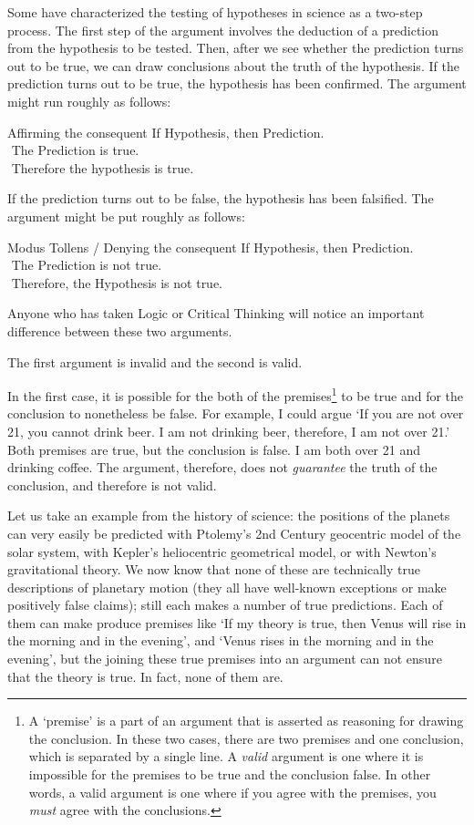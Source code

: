 \begin{refsection}
Some have characterized the testing of hypotheses in science as a two-step process. The first step of the argument involves the deduction of a prediction from the hypothesis to be tested. Then, after we see whether the prediction turns out to be true, we can draw conclusions about the truth of the hypothesis. If the prediction turns out to be true, the hypothesis has been confirmed. The argument might run roughly as follows:
\begin{apatextbox}{Affirming the consequent}
If Hypothesis, then Prediction.\\ The Prediction is true. \\ \hline Therefore the hypothesis is true.
\end{apatextbox}
If the prediction turns out to be false, the hypothesis has been falsified. The argument might be put roughly as follows:
\begin{apatextbox}{Modus Tollens / Denying the consequent}
If Hypothesis, then Prediction.\\ The Prediction is not true.\\ \hline Therefore, the Hypothesis is not true.
\end{apatextbox}
Anyone who has taken Logic or Critical Thinking will notice an important difference between these two arguments. 

The first argument is invalid and the second is valid. 

In the first case, it is possible for the both of the premises\footnote{A `premise' is a part of an argument that is asserted as reasoning for drawing the conclusion. In these two cases, there are two premises and one conclusion, which is separated by a single line. A \emph{valid} argument is one where it is impossible for the premises to be true and the conclusion false. In other words, a valid argument is one where if you agree with the premises, you \emph{must} agree with the conclusions.} to be true and for the conclusion to nonetheless be false. For example, I could argue `If you are not over 21, you cannot drink beer. I am not drinking beer, therefore, I am not over 21.' Both premises are true, but the conclusion is false. I am both over 21 and drinking coffee. The argument, therefore, does not \emph{guarantee} the truth of the conclusion, and therefore is not valid.

Let us take an example from the history of science: the positions of the planets can very easily be predicted with Ptolemy's 2nd Century geocentric model of the solar system, with Kepler's heliocentric geometrical model, or with Newton's gravitational theory. We now know that none of these are technically true descriptions of planetary motion (they all have well-known exceptions or make positively false claims); still each makes a number of true predictions. Each of them can make produce premises like `If my theory is true, then Venus will rise in the morning and in the evening', and `Venus rises in the morning and in the evening', but the joining these true premises into an argument can not ensure that the theory is true. In fact, none of them are.


\end{refsection}
